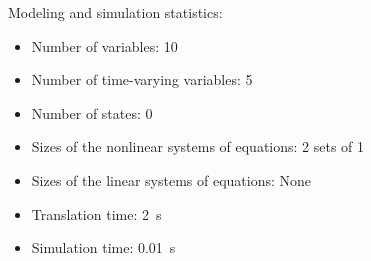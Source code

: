 \begin{contextbox}
  Modeling and simulation statistics:
  \begin{itemize}
    \item Number of variables: 10
    \item Number of time-varying variables: 5
    \item Number of states: 0
    \item Sizes of the nonlinear systems of equations: 2 sets of 1
    \item Sizes of the linear systems of equations: None
    \item Translation time: \SI{2}{s}
    \item Simulation time: \SI{0.01}{s}
  \end{itemize}
\end{contextbox}